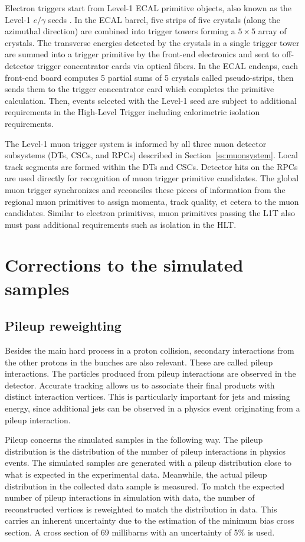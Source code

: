 Electron triggers start from Level-1 ECAL primitive objects,
also known as the Level-1 $e/\gamma$ seeds \cite{Khachatryan:2016bia}.
In the ECAL barrel, five strips of five crystals (along the azimuthal direction)
are combined into trigger towers forming a $5\times5$ array of crystals.
The transverse energies detected by the crystals in a single trigger tower are summed
into a trigger primitive by the front-end electronics and sent to off-detector
trigger concentrator cards via optical fibers. 
In the ECAL endcaps, each front-end board computes 5 partial sums of 5 crystals called pseudo-strips,
then sends them to the trigger concentrator card which completes the primitive calculation.
Then, events selected with the Level-1 seed are subject to additional requirements in
the High-Level Trigger including calorimetric isolation requirements.

The Level-1 muon trigger system is informed by all three muon detector subsystems (DTs, CSCs, and RPCs) described in Section~\ref{ss:muonsystem}.
Local track segments are formed within the DTs and CSCs.
Detector hits on the RPCs are used directly for recognition of muon trigger primitive candidates.
The global muon trigger synchronizes and reconciles these pieces of information
from the regional muon primitives to assign momenta, track quality, et cetera to the muon candidates.
Similar to electron primitives, muon primitives passing the L1T also must pass
additional requirements such as isolation in the HLT.

\section{Corrections to the simulated samples}
\subsection{Pileup reweighting}
\label{subsec:puweights}

Besides the main hard process in a proton collision, secondary interactions from the other protons in the bunches are also relevant.
These are called pileup interactions. 
The particles produced from pileup interactions are observed in the detector.
Accurate tracking allows us to associate their final products with distinct interaction vertices.
This is particularly important for jets and missing energy, since additional jets can be observed in a physics event originating from a pileup interaction.

Pileup concerns the simulated samples in the following way.
The pileup distribution is the distribution of the number of pileup interactions in physics events.
The simulated samples are generated with a pileup distribution close to what is expected in the experimental data.
Meanwhile, the actual pileup distribution in the collected data sample is measured.
To match the expected number of pileup interactions in simulation with data,
the number of reconstructed vertices is reweighted to match the distribution in data.
This carries an inherent uncertainty due to the estimation of the minimum bias cross section.
A cross section of  69 millibarns with an uncertainty of 5\% is used.

